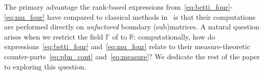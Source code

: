 \documentclass[12pt]{article}
\numberwithin{equation}{section}
\newcommand{\+}{%
	\raisebox{0.18ex}{\scaleobj{0.55}{+}}
}
\theoremstyle{definition}
\begin{document}
The primary advantage the rank-based expressions from~\eqref{eq:betti_four}-\eqref{eq:mu_four} have compared to classical methods in~\cite{edelsbrunner2022computational, zomorodian2004computing} is that their computations are performed directly on \emph{unfactored} boundary (sub)matrices. 
A natural question arises when we restrict the field $\mathbb{F}$ of to $\mathbb{R}$: computationally, how do expressions~\eqref{eq:betti_four} and~\eqref{eq:mu_four} relate to their measure-theoretic counter-parts~\eqref{eq:pbn_cont} and~\eqref{eq:measure}?
We dedicate the rest of the paper to exploring this question. 



\end{document}
